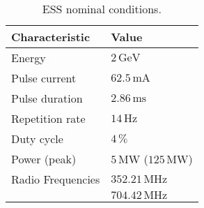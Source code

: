 \begin{table}[ht]
  \centering
  \caption[ESS nominal conditions]
  {ESS nominal conditions.}
  \label{chap2:tab:ess_charac}
  \begin{tabularx}{\linewidth}{XX}
    \toprule
    Characteristic    & Value                                 \\
    \midrule
    Energy            & $2\,\mathrm{GeV}$                     \\
    Pulse current     & $62.5\,\mathrm{mA}$                   \\
    Pulse duration    & $2.86\,\mathrm{ms}$                   \\
    Repetition rate   & $14\,\mathrm{Hz}$                     \\
    Duty cycle        & $4\,\mathrm{\%}$                      \\
    Power (peak)      & $5\,\mathrm{MW}$ ($125\,\mathrm{MW}$) \\
    Radio Frequencies & $352.21\,\mathrm{MHz}$                \\
                      & $704.42\,\mathrm{MHz}$                \\
    \bottomrule
  \end{tabularx}
\end{table}